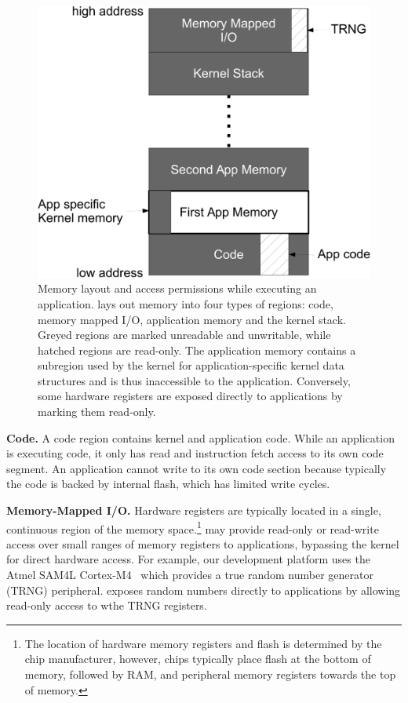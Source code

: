 \begin{figure}
 \centering
\includegraphics[width=1\columnwidth]{img/memory-layout-crop}
\caption{Memory layout and access permissions while executing an application.
\name lays out memory into four types of regions: code, memory mapped I/O,
application memory and the kernel stack. Greyed regions are marked unreadable
and unwritable, while hatched regions are read-only. The application memory
contains a subregion used by the kernel for application-specific kernel data
structures and is thus inaccessible to the application. Conversely, some
hardware registers are exposed directly to applications by marking them
read-only.}
 \label{fig:memory-layout}
\end{figure}



{\bf Code.}
A code region contains kernel and application code. While an application is
executing code, it only has read and instruction fetch access to its own code
segment. An application cannot write to its own code section because typically
the code is backed by internal flash, which has limited write cycles.

{\bf Memory-Mapped I/O.}
Hardware registers are typically located in a single, continuous region of the
memory space.\footnote{The location of hardware memory registers and flash is
determined by the chip manufacturer, however, chips typically place flash at
the bottom of memory, followed by RAM, and peripheral memory registers towards
the top of memory.} \name may provide read-only or read-write access over small
ranges of memory registers to applications, bypassing the kernel for direct
hardware access. For example, our development platform uses the Atmel SAM4L
Cortex-M4~\cite{sam4l} which provides a true random number generator (TRNG)
peripheral. \name exposes random numbers directly to applications by allowing
read-only access to wthe TRNG registers.

